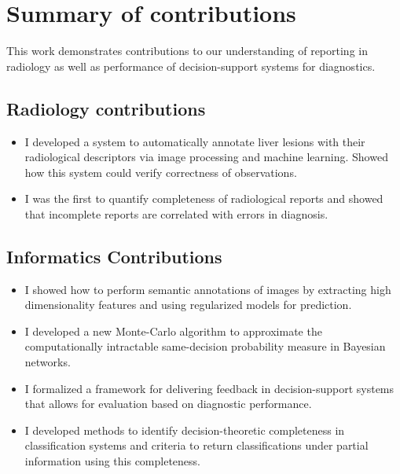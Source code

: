 \section{Summary of contributions}
This work demonstrates contributions to our understanding of reporting in radiology as well as performance of decision-support systems for diagnostics.

\subsection{Radiology contributions}

\begin{itemize}
	\item I developed a system to automatically annotate liver lesions with their radiological descriptors via image processing and machine learning. Showed how this system could verify correctness of observations.
	\item I was the first to quantify completeness of radiological reports and showed that incomplete reports are correlated with errors in diagnosis.
\end{itemize}

\subsection{Informatics Contributions}

\begin{itemize}
	\item I showed how to perform semantic annotations of images by extracting high dimensionality features and using regularized models for prediction.
	\item I developed a new Monte-Carlo algorithm to approximate the computationally intractable same-decision probability measure in Bayesian networks.
	\item I formalized a framework for delivering feedback in decision-support systems that allows for evaluation based on diagnostic performance.
	\item I developed methods to identify decision-theoretic completeness in classification systems and criteria to return classifications under partial information using this completeness.
\end{itemize}


